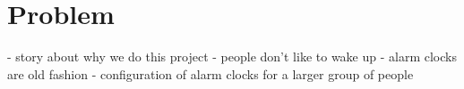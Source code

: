 \chapter{Problem} %
\label{cha:problem}
- story about why we do this project
- people don't like to wake up
- alarm clocks are old fashion
- configuration of alarm clocks for a larger group of people

